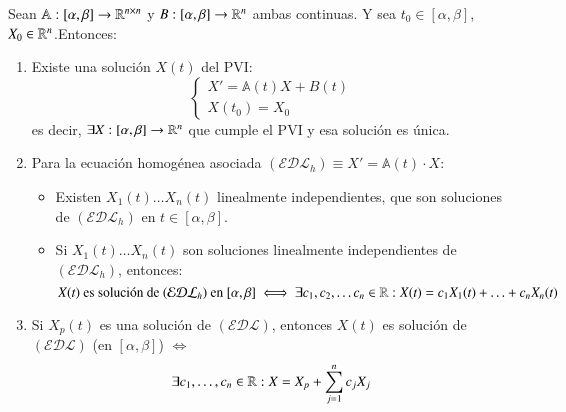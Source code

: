 \begin{thm}
    Sean $\mathbb{A} : [\alpha, \beta] \to \mathbb{R}^{n\times n}$ y $B : [\alpha, \beta] \to \mathbb{R}^n$ ambas continuas. Y sea $t_0 \in [\alpha, \beta]$, $X_0 \in\mathbb{R}^n$.Entonces:\\
    \begin{enumerate}
        \item Existe una solución $X(t)$ del PVI:
        $$
        \begin{cases}
            X' = \mathbb{A}(t) X + B(t)\\
            X(t_0) = X_0
        \end{cases}
        $$
        es decir, $\exists X : [\alpha, \beta] \to \mathbb{R}^n$ que cumple el PVI y esa solución es única.

        \item Para la ecuación homogénea asociada $(\mathcal{EDL}_h) \equiv X' = \mathbb{A}(t) \cdot X$:
        \begin{itemize}
            \item Existen $X_1(t) \ldots X_n(t)$ linealmente independientes, que son soluciones de $(\mathcal{EDL}_h)$ en $t \in [\alpha, \beta]$.
            \item Si $X_1(t) \ldots X_n(t)$ son soluciones linealmente independientes de $(\mathcal{EDL}_h)$, entonces:
            $$
            X(t) \text{ es solución de } (\mathcal{EDL}_h) \text{ en } [\alpha, \beta] \iff \exists c_1, c_2, \ldots c_n \in \mathbb{R} : X(t) = c_1X_1(t) + \ldots + c_nX_n(t)
            $$
        \end{itemize}
        \item Si $X_p(t)$ es una solución de $(\mathcal{EDL})$, entonces $X(t)$ es solución de $(\mathcal{EDL})$ (en $[\alpha, \beta]$) $\iff$
        $$\exists c_1, \ldots, c_n \in \mathbb{R} : X = X_p + \sum_{j=1}^n c_jX_j$$
    \end{enumerate}
\end{thm}

